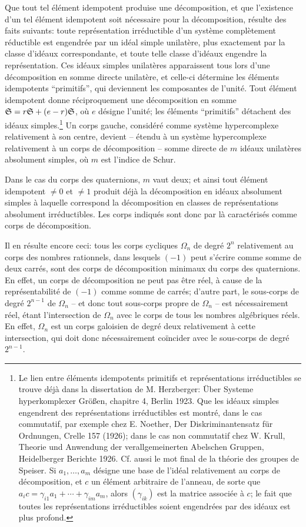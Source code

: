 Que tout tel élément idempotent produise une décomposition, et que l'existence d'un tel élément idempotent soit nécessaire pour la décomposition, résulte des faits suivants: toute représentation irréductible d'un système complètement réductible est engendrée par un idéal simple unilatère, plus exactement par la classe d'idéaux correspondante, et toute telle classe d'idéaux engendre la représentation. Ces idéaux simples unilatères apparaissent tous lors d'une décomposition en somme directe unilatère, et celle-ci détermine les éléments idempotents ``primitifs'', qui deviennent les composantes de l'unité. Tout élément idempotent donne réciproquement une décomposition en somme $\mathfrak S=r\mathfrak S+(e-r)\mathfrak S$, où $e$ désigne l'unité; les éléments ``primitifs'' détachent des idéaux simples.\footnote{Le lien entre éléments idempotents primitifs et représentations irréductibles se trouve déjà dans la dissertation de M. Herzberger: Über Systeme hyperkomplexer Größen, chapitre 4, Berlin 1923. Que les idéaux simples engendrent des représentations irréductibles est montré, dans le cas commutatif, par exemple chez E. Noether, Der Diskriminantensatz für Ordnungen, Crelle 157 (1926); dans le cas non commutatif chez W. Krull, Theorie und Anwendung der verallgemeinerten Abelschen Gruppen, Heidelberger Berichte 1926. Cf. aussi le mot final de la théorie des groupes de Speiser. Si $a_1,\ldots,a_m$ désigne une base de l'idéal relativement au corps de décomposition, et $c$ un élément arbitraire de l'anneau, de sorte que $a_i c=\gamma_{i1}a_1+\cdots+\gamma_{im}a_m$, alors $(\gamma_{ik})$ est la matrice associée à $c$; le fait que toutes les représentations irréductibles soient engendrées par des idéaux est plus profond.} Un corps gauche, considéré comme système hypercomplexe relativement à son centre, devient -- étendu à un système hypercomplexe relativement à un corps de décomposition -- somme directe de $m$ idéaux unilatères absolument simples, où $m$ est l'indice de Schur.

Dans le cas du corps des quaternions, $m$ vaut deux; et ainsi tout élément idempotent $\ne0$ et $\ne1$ produit déjà la décomposition en idéaux absolument simples à laquelle correspond la décomposition en classes de représentations absolument irréductibles. Les corps indiqués sont donc par là caractérisés comme corps de décomposition.

Il en résulte encore ceci: tous les corps cycliques $\Omega_n$ de degré $2^n$ relativement au corps des nombres rationnels, dans lesquels $(-1)$ peut s'écrire comme somme de deux carrés, sont des corps de décomposition minimaux du corps des quaternions. En effet, un corps de décomposition ne peut pas être réel, à cause de la représentabilité de $(-1)$ comme somme de carrés; d'autre part, le sous-corps de degré $2^{n-1}$ de $\Omega_n$ -- et donc tout sous-corps propre de $\Omega_n$ -- est nécessairement réel, étant l'intersection de $\Omega_n$ avec le corps de tous les nombres algébriques réels. En effet, $\Omega_n$ est un corps galoisien de degré deux relativement à cette intersection, qui doit donc nécessairement coïncider avec le sous-corps de degré $2^{n-1}$.

